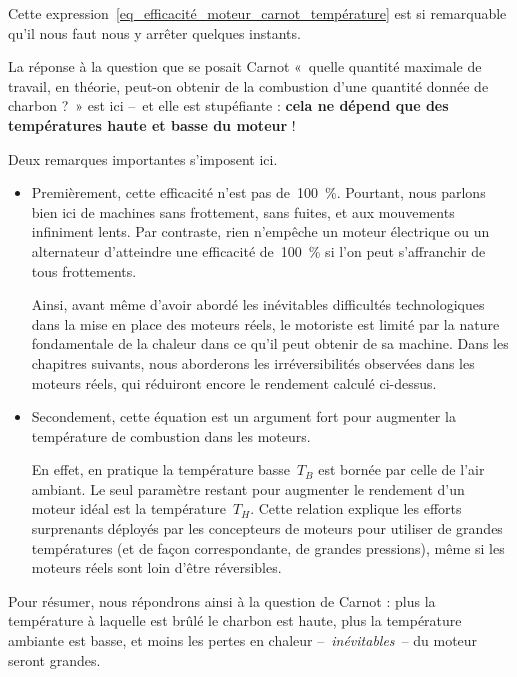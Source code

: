 		Cette expression~\ref{eq_efficacité_moteur_carnot_température} est si remarquable qu’il nous faut nous y arrêter quelques instants.

		La réponse à la question que se posait Carnot «~quelle quantité maximale de travail, en théorie, peut-on obtenir de la combustion d’une quantité donnée de charbon ?~» est ici --\ et elle est stupéfiante : \textbf{cela ne dépend que des températures haute et basse du moteur} !

		Deux remarques importantes s’imposent ici.

		\begin{itemize}
			\item Premièrement, cette efficacité n’est pas de~\SI{100}{\percent}. Pourtant, nous parlons bien ici de machines sans frottement, sans fuites, et aux mouvements infiniment lents. Par contraste, rien n’empêche un moteur électrique ou un alternateur d’atteindre une efficacité de~\SI{100}{\percent} si l’on peut s’affranchir de tous frottements. 

			Ainsi, avant même d’avoir abordé les inévitables difficultés technologiques dans la mise en place des moteurs réels, le motoriste est limité par la nature fondamentale de la chaleur dans ce qu’il peut obtenir de sa machine. Dans les chapitres suivants, nous aborderons les irréversibilités observées dans les moteurs réels, qui réduiront encore le rendement calculé ci-dessus.

			\item Secondement, cette équation est un argument fort pour augmenter la température de combustion dans les moteurs.

			En effet, en pratique la température basse~$T_B$ est bornée par celle de l’air ambiant. Le seul paramètre restant pour augmenter le rendement d’un moteur idéal est la température~$T_H$. Cette relation explique les efforts surprenants déployés par les concepteurs de moteurs pour utiliser de grandes températures (et de façon correspondante, de grandes pressions), même si les moteurs réels sont loin d’être réversibles.

		\end{itemize}

		Pour résumer, nous répondrons ainsi à la question de Carnot : plus la température à laquelle est brûlé le charbon est haute, plus la température ambiante est basse, et moins les pertes en chaleur --\ \emph{inévitables}\ -- du moteur seront grandes.
		

